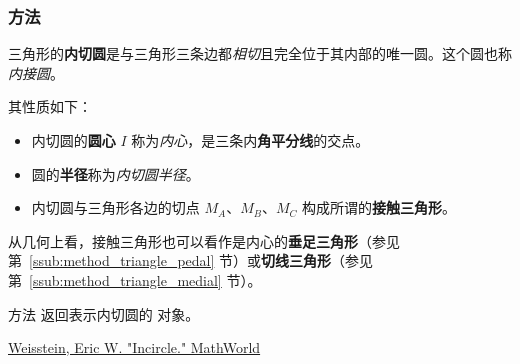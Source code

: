 \vspace{1em}

\begin{tkzexample}[latex=.5\textwidth]
\begin{center}
\end{center}
\end{tkzexample}

\subsubsection{方法 } %
\label{ssub:method_triangle_in_circle}

三角形的\textbf{内切圆}是与三角形三条边都\emph{相切}且完全位于其内部的唯一圆。这个圆也称\emph{内接圆}。

\medskip

其性质如下：
\begin{itemize}
  \item 内切圆的\textbf{圆心} $I$ 称为\emph{内心}，是三条内\textbf{角平分线}的交点。
  \item 圆的\textbf{半径}称为\emph{内切圆半径}。
  \item 内切圆与三角形各边的切点 $M_A$、$M_B$、$M_C$ 构成所谓的\textbf{接触三角形}。
\end{itemize}


从几何上看，接触三角形也可以看作是内心的\textbf{垂足三角形}（参见第~\ref{ssub:method_triangle_pedal} 节）或\textbf{切线三角形}（参见第~\ref{ssub:method_triangle_medial} 节）。

\medskip

方法  返回表示内切圆的  对象。
\begin{flushright}
\small
\href{[URL1]}{Weisstein, Eric W. "Incircle." MathWorld}
\end{flushright}

\vspace{1em}

